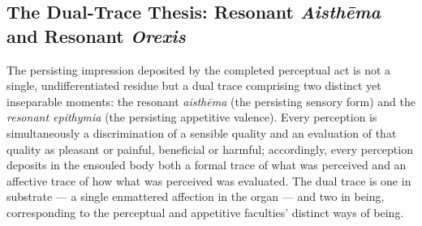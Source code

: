 \subsection{The Dual-Trace Thesis: Resonant \textit{Aisthēma} and Resonant \textit{Orexis}}

The persisting impression deposited by the completed perceptual act is not a single, undifferentiated residue but a dual trace comprising two distinct yet inseparable moments: the resonant \textit{aisthēma} (the persisting sensory form) and the \textit{resonant epithymia} (the persisting appetitive valence). Every perception is simultaneously a discrimination of a sensible quality and an evaluation of that quality as pleasant or painful, beneficial or harmful; accordingly, every perception deposits in the ensouled body both a formal trace of what was perceived and an affective trace of how what was perceived was evaluated. The dual trace is one in substrate --- a single enmattered affection in the organ --- and two in being, corresponding to the perceptual and appetitive faculties' distinct ways of being.

